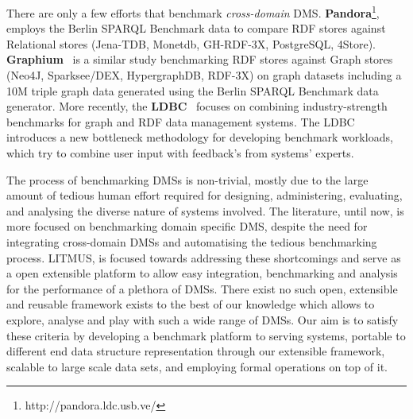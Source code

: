 \documentclass{llncs}
\newcommand{\todoproofread}[3]{
    \todoitemtemplate{#1}{#2}{Please proof read above section; #3}{inline}{yellow}
}
\newcommand{\todoitemtemplate}[5]{%
\todo[#4,color=#5,caption=X]{{#1}{ \textbf{{\tiny{for}} #2}:}{#3}}%
}
\begin{document}
    
    There are only a few efforts that benchmark \textit{cross-domain} DMS. \textbf{Pandora}\footnote{http://pandora.ldc.usb.ve/}, employs the Berlin SPARQL Benchmark data to compare RDF stores against Relational stores (Jena-TDB, Monetdb, GH-RDF-3X, PostgreSQL, 4Store). 
    \textbf{Graphium}~\cite{flores2013graphium} is a similar study benchmarking RDF stores against Graph stores (Neo4J, Sparksee/DEX, HypergraphDB, RDF-3X) on graph datasets including a 10M triple graph data generated using the Berlin SPARQL Benchmark data generator. More recently, the \textbf{LDBC}~\cite{DBLP:journals/sigmod/AnglesBLF0ENMKT14} focuses on combining industry-strength benchmarks for graph and RDF data management systems.
    The LDBC introduces a new bottleneck methodology for developing benchmark workloads, which try to combine user input with feedback's from systems' experts.%
    
    The process of benchmarking DMSs is non-trivial, mostly due to the large amount of tedious human effort required for designing, administering, evaluating, and analysing the diverse nature of systems involved. The literature, until now, is more focused on benchmarking domain specific DMS, despite the need for integrating cross-domain DMSs and automatising the tedious benchmarking process. LITMUS, is focused towards addressing these shortcomings  and serve as a open extensible platform to allow easy integration, benchmarking and analysis for the performance of a plethora of DMSs. There exist no such open, extensible and reusable framework exists to the best of our knowledge which allows to explore, analyse and play with such a wide range of DMSs.
    Our aim is to satisfy these criteria by developing a benchmark platform to serving systems, portable to different end data structure representation through our extensible framework, scalable to large scale data sets, and employing formal operations on top of it.
    
    

    
        
\end{document}

